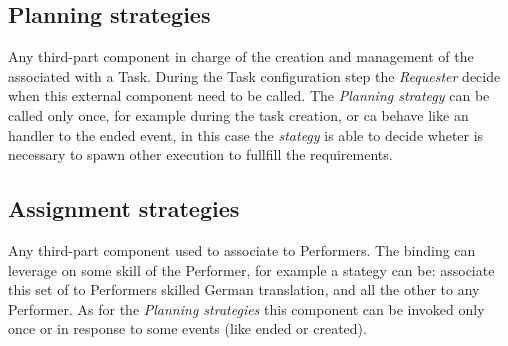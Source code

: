 \subsection{Planning strategies}
Any third-part component in charge of the creation and management of the \utask{}
associated with a Task. During the Task configuration step the \emph{Requester}
decide when this external component need to be called. The \emph{Planning
strategy} can be called only once, for example during the task creation, or
ca behave like an handler to the \utask{} ended event, in this case the
\emph{stategy} is able to decide wheter is necessary to spawn other \utask{}
execution to fullfill the requirements.



\subsection{Assignment strategies}
Any third-part component used to associate \utask{} to Performers. The binding
can leverage on some skill of the Performer, for example a stategy can be:
associate this set of \utask{} to Performers skilled German translation, and
all the other to any Performer. As for the \emph{Planning strategies} this
component can be invoked only once or in response to some events (like \utask{}
ended or created).